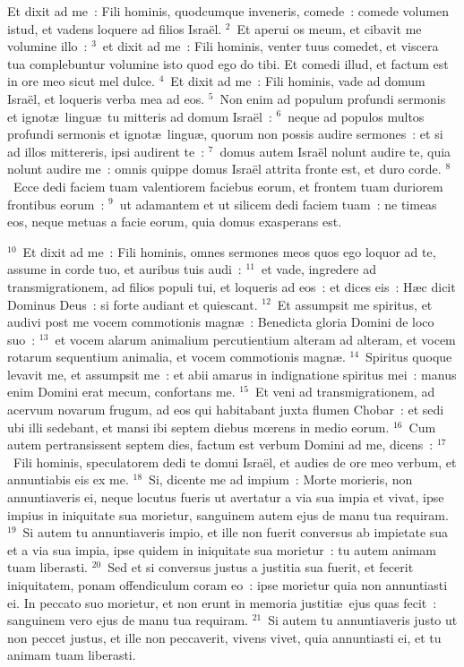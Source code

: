 \bchapter
\lettrine[lines=3,image=true,loversize=0.05,lraise=-0.03]{E}{}t dixit ad me~: Fili hominis, quodcumque inveneris, comede~: comede volumen istud, et vadens loquere ad filios Isra\"el.
${}^{2}$~Et aperui os meum, et cibavit me volumine illo~:
${}^{3}$~et dixit ad me~: Fili hominis, venter tuus comedet, et viscera tua complebuntur volumine isto quod ego do tibi. Et comedi illud, et factum est in ore meo sicut mel dulce.
${}^{4}$~Et dixit ad me~: Fili hominis, vade ad domum Isra\"el, et loqueris verba mea ad eos.
${}^{5}$~Non enim ad populum profundi sermonis et ignot\ae\ lingu\ae\ tu mitteris ad domum Isra\"el~:
${}^{6}$~neque ad populos multos profundi sermonis et ignot\ae\ lingu\ae , quorum non possis audire sermones~: et si ad illos mittereris, ipsi audirent te~:
${}^{7}$~domus autem Isra\"el nolunt audire te, quia nolunt audire me~: omnis quippe domus Isra\"el attrita fronte est, et duro corde.
${}^{8}$~Ecce dedi faciem tuam valentiorem faciebus eorum, et frontem tuam duriorem frontibus eorum~:
${}^{9}$~ut adamantem et ut silicem dedi faciem tuam~: ne timeas eos, neque metuas a facie eorum, quia domus exasperans est.


${}^{10}$~Et dixit ad me~: Fili hominis, omnes sermones meos quos ego loquor ad te, assume in corde tuo, et auribus tuis audi~:
${}^{11}$~et vade, ingredere ad transmigrationem, ad filios populi tui, et loqueris ad eos~: et dices eis~: H\ae c dicit Dominus Deus~: si forte audiant et quiescant.
${}^{12}$~Et assumpsit me spiritus, et audivi post me vocem commotionis magn\ae~: Benedicta gloria Domini de loco suo~:
${}^{13}$~et vocem alarum animalium percutientium alteram ad alteram, et vocem rotarum sequentium animalia, et vocem commotionis magn\ae .
${}^{14}$~Spiritus quoque levavit me, et assumpsit me~: et abii amarus in indignatione spiritus mei~: manus enim Domini erat mecum, confortans me.
${}^{15}$~Et veni ad transmigrationem, ad acervum novarum frugum, ad eos qui habitabant juxta flumen Chobar~: et sedi ubi illi sedebant, et mansi ibi septem diebus mœrens in medio eorum.
${}^{16}$~Cum autem pertransissent septem dies, factum est verbum Domini ad me, dicens~:
${}^{17}$~Fili hominis, speculatorem dedi te domui Isra\"el, et audies de ore meo verbum, et annuntiabis eis ex me.
${}^{18}$~Si, dicente me ad impium~: Morte morieris, non annuntiaveris ei, neque locutus fueris ut avertatur a via sua impia et vivat, ipse impius in iniquitate sua morietur, sanguinem autem ejus de manu tua requiram.
${}^{19}$~Si autem tu annuntiaveris impio, et ille non fuerit conversus ab impietate sua et a via sua impia, ipse quidem in iniquitate sua morietur~: tu autem animam tuam liberasti.
${}^{20}$~Sed et si conversus justus a justitia sua fuerit, et fecerit iniquitatem, ponam offendiculum coram eo~: ipse morietur quia non annuntiasti ei. In peccato suo morietur, et non erunt in memoria justiti\ae\ ejus quas fecit~: sanguinem vero ejus de manu tua requiram.
${}^{21}$~Si autem tu annuntiaveris justo ut non peccet justus, et ille non peccaverit, vivens vivet, quia annuntiasti ei, et tu animam tuam liberasti.


